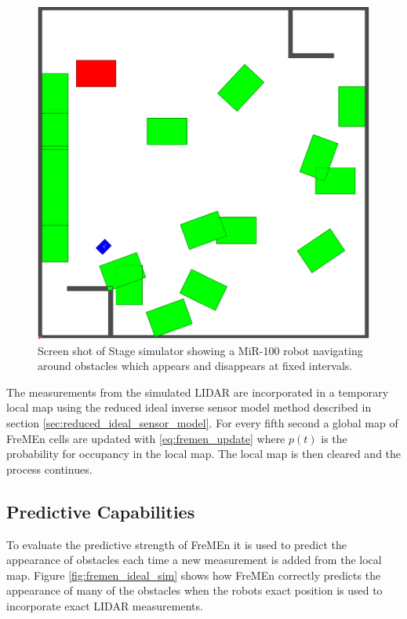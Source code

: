 \begin{figure}[htbp]
    \centering
    \includegraphics[width=0.4\linewidth]{chapters/mapping_of_dynamic_areas/figures/simulated_environment}
    \caption{Screen shot of Stage simulator \cite{Vaughan2008} showing a MiR-100 robot navigating around obstacles which appears and disappears at fixed intervals.}
    \label{fig:simulated_environment}
\end{figure}

The measurements from the simulated LIDAR are incorporated in a temporary local map using the reduced ideal inverse sensor model method described in section \ref{sec:reduced_ideal_sensor_model}. 
For every fifth second a global map of FreMEn cells are updated with \ref{eq:fremen_update} where $p(t)$ is the probability for occupancy in the local map. 
The local map is then cleared and the process continues.

\subsection{Predictive Capabilities}
To evaluate the predictive strength of FreMEn it is used to predict the appearance of obstacles each time a new measurement is added from the local map. 
Figure \ref{fig:fremen_ideal_sim} shows how FreMEn correctly predicts the appearance of many of the obstacles when the robots exact position is used to incorporate exact LIDAR measurements. 

